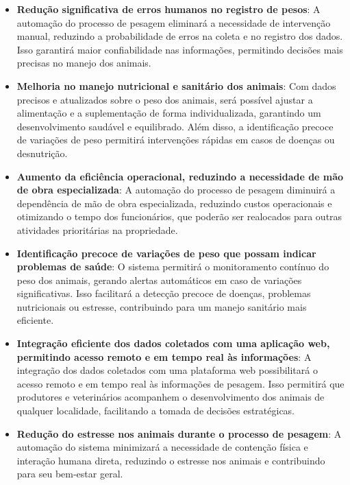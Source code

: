 \documentclass[11pt]{article}
\begin{document}
\begin{itemize}
\item \textbf{Redução significativa de erros humanos no registro de pesos}:
A automação do processo de pesagem eliminará a necessidade de intervenção manual, reduzindo a probabilidade de erros na coleta e no registro dos dados. Isso garantirá maior confiabilidade nas informações, permitindo decisões mais precisas no manejo dos animais.

\item \textbf{Melhoria no manejo nutricional e sanitário dos animais}: 
Com dados precisos e atualizados sobre o peso dos animais, será possível ajustar a alimentação e a suplementação de forma individualizada, garantindo um desenvolvimento saudável e equilibrado. Além disso, a identificação precoce de variações de peso permitirá intervenções rápidas em casos de doenças ou desnutrição.

\item \textbf{Aumento da eficiência operacional, reduzindo a necessidade de mão de obra especializada}: 
A automação do processo de pesagem diminuirá a dependência de mão de obra especializada, reduzindo custos operacionais e otimizando o tempo dos funcionários, que poderão ser realocados para outras atividades prioritárias na propriedade.

\item \textbf{Identificação precoce de variações de peso que possam indicar problemas de saúde}: 
O sistema permitirá o monitoramento contínuo do peso dos animais, gerando alertas automáticos em caso de variações significativas. Isso facilitará a detecção precoce de doenças, problemas nutricionais ou estresse, contribuindo para um manejo sanitário mais eficiente.

\item \textbf{Integração eficiente dos dados coletados com uma aplicação web, permitindo acesso remoto e em tempo real às informações}: 
A integração dos dados coletados com uma plataforma web possibilitará o acesso remoto e em tempo real às informações de pesagem. Isso permitirá que produtores e veterinários acompanhem o desenvolvimento dos animais de qualquer localidade, facilitando a tomada de decisões estratégicas.

\item \textbf{Redução do estresse nos animais durante o processo de pesagem}: 
A automação do sistema minimizará a necessidade de contenção física e interação humana direta, reduzindo o estresse nos animais e contribuindo para seu bem-estar geral.


\end{itemize}
\end{document}
